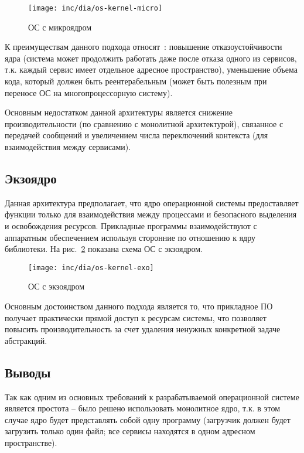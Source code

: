 \begin{figure}[ht!]
  \centering
  \texttt{[image: inc/dia/os-kernel-micro]}
  \caption{ОС с микроядром}
  \label{fig:os-kernel-micro}
\end{figure}

К преимуществам данного подхода относят~\cite{os_dev}: повышение
отказоустойчивости ядра (система может продолжить работать даже после
отказа одного из сервисов, т.к. каждый сервис имеет отдельное адресное
пространство), уменьшение объема кода, который должен быть реентерабельным
(может быть полезным при переносе ОС на многопроцессорную систему).

Основным недостатком данной архитектуры является снижение производительности
(по сравнению с монолитной архитектурой), связанное с передачей сообщений и
увеличением числа переключений контекста (для взаимодействия между сервисами).

\subsection{Экзоядро}
Данная архитектура предполагает, что ядро операционной системы предоставляет
функции только для взаимодействия между процессами и безопасного выделения и
освобождения ресурсов. Прикладные программы взаимодействуют с аппаратным
обеспечением используя сторонние по отношению к ядру библиотеки.
На рис.~\ref{fig:os-kernel-exo} показана схема ОС с экзоядром.

\begin{figure}[ht!]
  \centering
  \texttt{[image: inc/dia/os-kernel-exo]}
  \caption{ОС с экзоядром}
  \label{fig:os-kernel-exo}
\end{figure}

Основным достоинством данного подхода является то, что прикладное ПО получает
практически прямой доступ к ресурсам системы, что позволяет повысить производительность
за счет удаления ненужных конкретной задаче абстракций.

\subsection*{Выводы}
Так как одним из основных требований к разрабатываемой операционной системе
является простота -- было решено использовать монолитное ядро, т.к. в этом
случае ядро будет представлять собой одну программу (загрузчик должен
будет загрузить только один файл; все сервисы находятся в одном адресном
пространстве).

